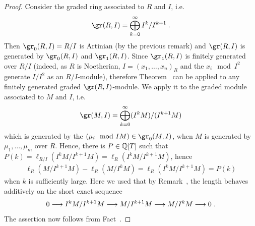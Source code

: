 \documentclass[a4paper,parskip=half,numbers=enddot, DIV=12]{scrreprt}
\begin{document}
\begin{proof}
    Consider the graded ring associated to $R$ and $I$, i.e.
    \begin{align*}
    	\gr(R,I) = \bigoplus_{k=0}^\infty I^k/I^{k+1}\;. 
    \end{align*}
    Then $\gr_0(R,I) = R/I$ is Artinian (by the previous remark) and $\gr(R,I)$ is generated by $\gr_0(R,I)$ and $\gr_1(R,I)$. Since $\gr_1(R,I)$ is finitely generated over $R/I$ (indeed, as $R$ is Noetherian, $I =  (x_1,\ldots, x_n)_R$ and the $x_i\mod I^2$ generate $I/I^2$ as an $R/I$-module), therefore Theorem~ can be applied to any finitely generated graded $\gr(R,I)$-module. We apply it to the graded module associated to $M$ and $I$, i.e.
    \begin{align*}
    	\gr(M,I) = \bigoplus_{k=0}^\infty (I^kM)/(I^{k+1}M)
    \end{align*}	
   	which is generated by the $(\mu_i \mod IM)\in \gr_0(M,I)$, when $M$ is generated by $\mu_1,\ldots,\mu_m$ over $R$. Hence, there is $P\in \mathbb{Q}[T]$ such that $P(k) = \ell_{R/I} (I^kM/I^{k+1}M) = \ell_R(I^kM/I^{k+1}M)$, hence
    \begin{align*}
        \ell_R(M/I^{k+1}M) - \ell_R(M/I^kM) = \ell_R(I^kM/I^{k+1}M) = P(k)
    \end{align*}
    when $k$ is sufficiently large. Here we used that by Remark~, the length behaves additively on the short exact sequence
    \begin{align*}
    	0\morphism I^kM/I^{k+1} M \morphism M/I^{k+1}M \morphism M/I^kM\morphism 0\;.
    \end{align*}
    The assertion now follows from Fact~.
\end{proof}
\end{document}
